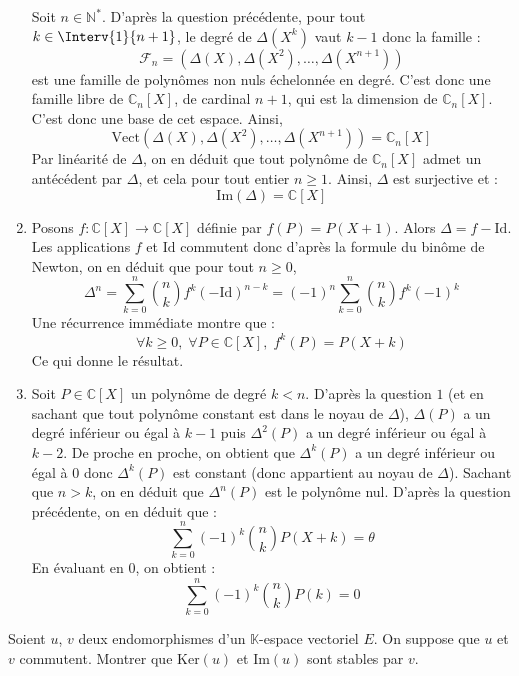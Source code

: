 \documentclass[a4paper,10pt]{report}
\begin{document}
\begin{enumerate}
\noindent Soit $n \in \mathbb{N}^*$. D'après la question précédente, pour tout $k \in \Interv{1}{n+1}$, le degré de $\Delta(X^k)$ vaut $k-1$ donc la famille :
$$ \mathcal{F}_n = (\Delta(X), \Delta(X^2), \ldots, \Delta(X^{n+1}))$$
 est une famille de polynômes non nuls échelonnée en degré. C'est donc une famille libre de $\mathbb{C}_n[X]$, de cardinal $n+1$, qui est la dimension de $\mathbb{C}_n[X]$. C'est donc une base de cet espace. Ainsi,
 $$ \textrm{Vect}(\Delta(X), \Delta(X^2), \ldots, \Delta(X^{n+1})) = \mathbb{C}_n[X]$$
 Par linéarité de $\Delta$, on en déduit que tout polynôme de $\mathbb{C}_n[X]$ admet un antécédent par $\Delta$, et cela pour tout entier $n \geq 1$. Ainsi, $\Delta$ est surjective et :
 $$ \textrm{Im}(\Delta) = \mathbb{C}[X]$$
 \item Posons $f : \mathbb{C}[X] \rightarrow \mathbb{C}[X]$ définie par $f(P)=P(X+1)$. Alors $\Delta = f - \textrm{Id}$. Les applications $f$ et $\textrm{Id}$ commutent donc d'après la formule du binôme de Newton, on en déduit que pour tout $n \geq 0$,
 $$ \Delta^n = \sum_{k=0}^n \binom{n}{k} f^k (- \textrm{Id})^{n-k}  = (-1)^n \sum_{k=0}^n \binom{n}{k} f^k (-1)^k$$
 Une récurrence immédiate montre que :
 $$ \forall k \geq 0, \; \forall P \in \mathbb{C}[X], \; f^k (P)= P(X+k)$$
 Ce qui donne le résultat.
 \item Soit $P \in \mathbb{C}[X]$ un polynôme de degré $k <n$. D'après la question $1$ (et en sachant que tout polynôme constant est dans le noyau de $\Delta$), $\Delta(P)$ a un degré inférieur ou égal à $k-1$ puis $\Delta^2(P)$ a un degré inférieur ou égal à $k-2$. De proche en proche, on obtient que $\Delta^k(P)$ a un degré inférieur ou égal à $0$ donc $\Delta^k(P)$ est constant (donc appartient au noyau de $\Delta$). Sachant que $n>k$, on en déduit que $\Delta^n(P)$ est le polynôme nul. D'après la question précédente, on en déduit que :
$$\sum_{k = 0}^{n} ( - 1)^{k} \binom{n}{k}P(X + k) = \theta$$
 En évaluant en $0$, on obtient :
 $$ \sum_{k = 0}^{n} ( - 1)^{k} \binom{n}{k}P(k) = 0$$
\end{enumerate}

\medskip

\begin{Exa} Soient $u$, $v$ deux endomorphismes d'un $\mathbb{K}$-espace vectoriel $E$. On suppose que $u$ et $v$ commutent. Montrer que $\textrm{Ker}(u)$ et $\textrm{Im}(u)$ sont stables par $v$.
\end{Exa} 

\corr 

\medskip
\end{document}
